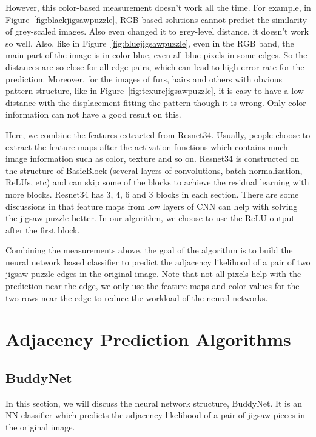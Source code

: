 \documentclass{article}
\begin{document}
However, this color-based measurement doesn't work all the time. For example, in Figure~\ref{fig:blackjigsawpuzzle}, RGB-based solutions cannot predict the similarity of grey-scaled images. Also even changed it to grey-level distance, it doesn't work so well. Also, like in Figure~\ref{fig:bluejigsawpuzzle}, even in the RGB band, the main part of the image is in color blue, even all blue pixels in some edges. So the distances are so close for all edge pairs, which can lead to high error rate for the prediction. Moreover, for the images of furs, hairs and others with obvious pattern structure, like in Figure~\ref{fig:texurejigsawpuzzle}, it is easy to have a low distance with the displacement fitting the pattern though it is wrong. Only color information can not have a good result on this.

Here, we combine the features extracted from Resnet34\cite{he2016deep}. Usually, people choose to extract the feature maps after the activation functions which contains much image information such as color, texture and so on. Resnet34 is constructed on the structure of BasicBlock (several layers of convolutions, batch normalization, ReLUs, etc) and can skip some of the blocks to achieve the residual learning with more blocks. Resnet34 has 3, 4, 6 and 3 blocks in each section. There are some discussions in \cite{noroozi2016unsupervised} that feature maps from low layers of CNN can help with solving the jigsaw puzzle better. In our algorithm, we choose to use the ReLU output after the first block.

Combining the measurements above, the goal of the algorithm is to build the neural network based classifier to predict the adjacency likelihood of a pair of two jigsaw puzzle edges in the original image. Note that not all pixels help with the prediction near the edge, we only use the feature maps and color values for the two rows near the edge to reduce the workload of the neural networks.

\section{Adjacency Prediction Algorithms}

\subsection{BuddyNet}

In this section, we will discuss the neural network structure, BuddyNet. It is an NN classifier which predicts the adjacency likelihood of a pair of jigsaw pieces in the original image.
\end{document}

